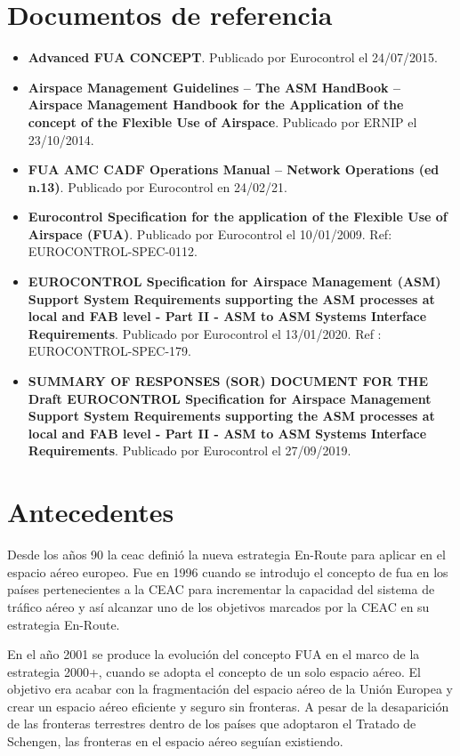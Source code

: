 \section{Documentos de referencia}

\begin{itemize}
    \item \textbf{Advanced FUA CONCEPT}. Publicado por Eurocontrol el 24/07/2015. 
    \item \textbf{Airspace Management Guidelines – The ASM HandBook – Airspace Management Handbook for the Application of the concept of the Flexible Use of Airspace}. Publicado por ERNIP el 23/10/2014. 
    \item \textbf{FUA AMC CADF Operations Manual – Network Operations (ed n.13)}. Publicado por Eurocontrol en 24/02/21. 
    \item \textbf{Eurocontrol Specification for the application of the Flexible Use of Airspace (FUA)}. Publicado por Eurocontrol el 10/01/2009. Ref: EUROCONTROL-SPEC-0112.
    \item \textbf{EUROCONTROL Specification for Airspace Management (ASM) Support System Requirements supporting the ASM processes at local and FAB level - Part II - ASM to ASM Systems Interface Requirements}. Publicado por Eurocontrol el 13/01/2020. Ref : EUROCONTROL-SPEC-179.
    \item \textbf{SUMMARY OF RESPONSES (SOR) DOCUMENT FOR THE Draft EUROCONTROL Specification for Airspace Management Support System Requirements supporting the ASM processes at local and FAB level - Part II - ASM to ASM Systems Interface Requirements}. Publicado por Eurocontrol el 27/09/2019. 
\end{itemize}

\section{Antecedentes}

Desde los años 90 la \acrfull{ceac} definió la nueva estrategia En-Route para aplicar en el espacio aéreo europeo. Fue en 1996 cuando se introdujo el concepto de \acrfull{fua} en los países pertenecientes a la CEAC para incrementar la capacidad del sistema de tráfico aéreo y así alcanzar uno de los objetivos marcados por la CEAC en su estrategia En-Route. 
 
En el año 2001 se produce la evolución del concepto FUA en el marco de la estrategia 2000+, cuando se adopta el concepto de un solo espacio aéreo.  El objetivo era acabar con la fragmentación del espacio aéreo de la Unión Europea y crear un espacio aéreo eficiente y seguro sin fronteras. A pesar de la desaparición de las fronteras terrestres dentro de los países que adoptaron el Tratado de Schengen, las fronteras en el espacio aéreo seguían existiendo. 
 
